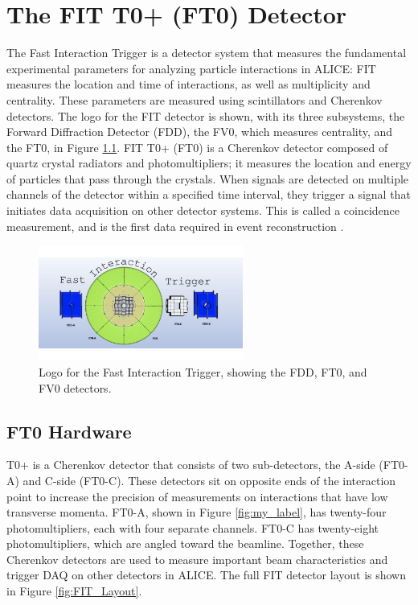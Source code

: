 
\chapter{The FIT T0+ (FT0) Detector}
The Fast Interaction Trigger is a detector system that measures the fundamental experimental parameters for analyzing particle interactions in ALICE: FIT measures the location and time of interactions, as well as multiplicity and centrality. These parameters are measured using scintillators and Cherenkov detectors. The logo for the FIT detector is shown, with its three subsystems, the Forward Diffraction Detector (FDD), the FV0, which measures centrality, and the FT0, in Figure \ref{fig:FIT_Logo}.  FIT T0+ (FT0) is a Cherenkov detector composed of quartz crystal radiators and photomultipliers; it measures the location and energy of particles that pass through the crystals. When signals are detected on multiple channels of the detector within a specified time interval, they trigger a signal that initiates data acquisition on other detector systems. This is called a coincidence measurement, and is the first data required in event reconstruction \cite{ALICE_Tracking_Readout_TDR}.

\begin{figure}[H]
    \centering
    \includegraphics[width=0.6\textwidth]{figures/FIT/FIT_Logo.jpg}
    \caption{Logo for the Fast Interaction Trigger, showing the FDD, FT0, and FV0 detectors.}
    \label{fig:FIT_Logo}
\end{figure}


\section{FT0 Hardware}
T0+ is a Cherenkov detector that consists of two sub-detectors, the A-side (FT0-A) and C-side (FT0-C). These detectors sit on opposite ends of the interaction point to increase the precision of measurements on interactions that have low transverse momenta. FT0-A, shown in Figure \ref{fig:my_label}, has twenty-four photomultipliers, each with four separate channels. FT0-C has twenty-eight photomultipliers, which are angled toward the beamline. Together, these Cherenkov detectors are used to measure important beam characteristics and trigger DAQ on other detectors in ALICE. The full FIT detector layout is shown in Figure \ref{fig:FIT_Layout}.

